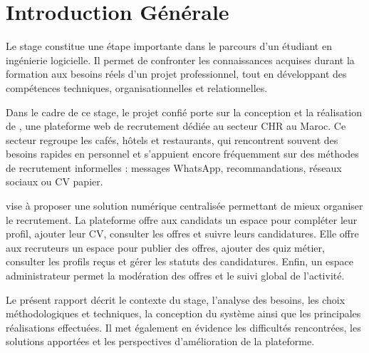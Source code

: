 \chapter*{Introduction Générale}

\noindent
Le stage constitue une étape importante dans le parcours d'un étudiant en ingénierie logicielle. Il permet de confronter les connaissances acquises durant la formation aux besoins réels d'un projet professionnel, tout en développant des compétences techniques, organisationnelles et relationnelles.

\noindent
Dans le cadre de ce stage, le projet confié porte sur la conception et la réalisation de \projectName{}, une plateforme web de recrutement dédiée au secteur CHR au Maroc. Ce secteur regroupe les cafés, hôtels et restaurants, qui rencontrent souvent des besoins rapides en personnel et s'appuient encore fréquemment sur des méthodes de recrutement informelles : messages WhatsApp, recommandations, réseaux sociaux ou CV papier.

\noindent
\projectName{} vise à proposer une solution numérique centralisée permettant de mieux organiser le recrutement. La plateforme offre aux candidats un espace pour compléter leur profil, ajouter leur CV, consulter les offres et suivre leurs candidatures. Elle offre aux recruteurs un espace pour publier des offres, ajouter des quiz métier, consulter les profils reçus et gérer les statuts des candidatures. Enfin, un espace administrateur permet la modération des offres et le suivi global de l'activité.

\noindent
Le présent rapport décrit le contexte du stage, l'analyse des besoins, les choix méthodologiques et techniques, la conception du système ainsi que les principales réalisations effectuées. Il met également en évidence les difficultés rencontrées, les solutions apportées et les perspectives d'amélioration de la plateforme.
